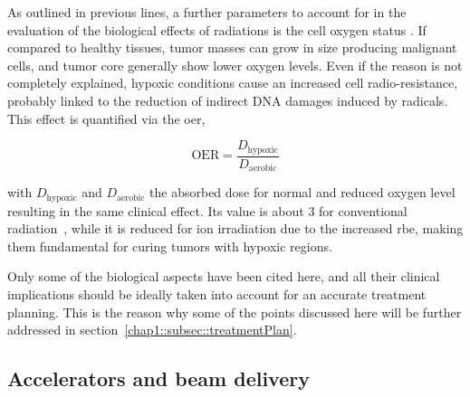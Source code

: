 As outlined in previous lines, a further parameters to account for in the evaluation of the biological effects of radiations is the cell oxygen status . If compared to healthy tissues, tumor masses can grow in size producing malignant cells, and tumor core generally show lower oxygen levels. Even if the reason is not completely explained, hypoxic conditions cause an increased cell radio-resistance, probably linked to the reduction of indirect DNA damages induced by radicals. This effect is quantified via the \gls{oer}, 

\begin{equation}
\mathrm{OER} = \frac{D_{\mathrm{hypoxic}}}{D_{\mathrm{aerobic}}}
\label{chap1::eq::oer}
\end{equation}

with $D_{\mathrm{hypoxic}}$ and $D_{\mathrm{aerobic}}$ the absorbed dose for normal and reduced oxygen level resulting in the same clinical effect. Its value is about 3 for conventional radiation~\parencite{Schardt2010}, while it is reduced for ion irradiation due to the increased \gls{rbe}, making them fundamental for curing tumors with hypoxic regions.

Only some of the biological aspects have been cited here, and all their clinical implications should be ideally taken into account for an accurate treatment planning. This is the reason why some of the points discussed here will be further addressed in section~\ref{chap1::subsec::treatmentPlan}. 

\subsection{Accelerators and beam delivery}\label{chap1::subsec::beamDelivery}

